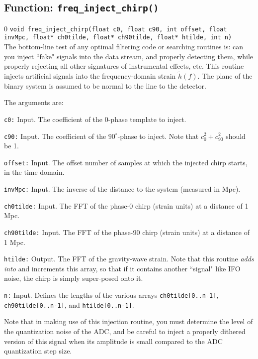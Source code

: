 \subsection{Function: {\tt freq\_inject\_chirp()}}
\label{ss:freq_inject_chirp}
\setcounter{equation}0
{\tt void freq\_inject\_chirp(float c0, float c90, int offset, float
    invMpc, float* ch0tilde, float* ch90tilde, float* htilde, int n) }\\
The bottom-line test of any optimal filtering code or searching
routines is: can you inject ``fake" signals into the data stream, and
properly detecting them, while properly rejecting all other signatures
of instrumental effects, etc.  This routine injects artificial signals
into the frequency-domain strain $\tilde h(f)$.  The plane of the binary
system is assumed to be normal to the line to the detector.

The arguments are:
\begin{description}
\item{\tt c0:} Input. The coefficient of the 0-phase template to inject.
\item{\tt c90:} Input. The coefficient of the $90^\circ$-phase to
   inject.  Note that $c_0^2 + c_{90}^2$ should be 1.
\item{\tt offset:} Input. The offset number of samples at which the injected chirp starts, in the
   time domain.
\item{\tt invMpc:} Input. The inverse of the distance to the system
(measured in Mpc).
\item{\tt ch0tilde:} Input. The FFT of the phase-0 chirp (strain units)
at a distance of 1 Mpc.
\item{\tt ch90tilde:} Input. The FFT of the phase-90 chirp (strain units)
at a distance of 1 Mpc.
\item{\tt htilde:} Output. The FFT of the gravity-wave strain.  Note that
this routine {\it adds into} and increments this array, so that if it
contains another ``signal" like IFO noise, the chirp is simply super-posed
onto it.
\item{\tt n:} Input.  Defines the lengths of the various arrays {\tt ch0tilde[0..n-1]},
{\tt ch90tilde[0..n-1]}, and {\tt htilde[0..n-1]}.
\end{description}

Note that in making use of this injection routine, you must determine
the level of the quantization noise of the ADC, and be careful to
inject a properly dithered version of this signal when its amplitude
is small compared to the ADC quantization step size.

